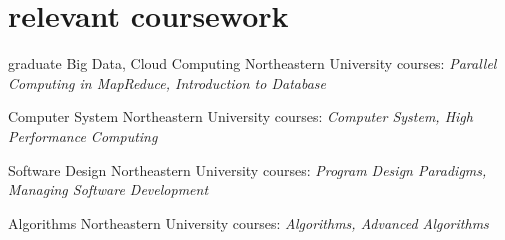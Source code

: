 \documentclass[]{ly-cv} %
\begin{document}

\section{relevant coursework}

\begin{entrylist}
\entry
{graduate}
{Big Data, Cloud Computing}
{Northeastern University}
{courses: \emph{Parallel Computing in MapReduce, Introduction to Database}\vspace*{4pt}}
\end{entrylist}
\begin{entrylist}
\entry
{}
{Computer System}
{Northeastern University}
{courses: \emph{Computer System, High Performance Computing}\vspace*{4pt}}
\end{entrylist}
\begin{entrylist}
\entry
{}
{Software Design}
{Northeastern University}
{courses: \emph{Program Design Paradigms, Managing Software Development}\vspace*{4pt}}
\end{entrylist}
\begin{entrylist}
\entry
{}
{Algorithms}
{Northeastern University}
{courses: \emph{Algorithms, Advanced Algorithms}}
\end{entrylist}
\end{document}
